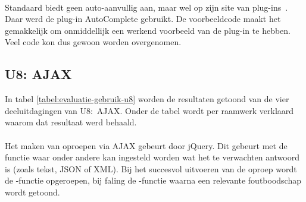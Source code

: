 \paragraph{\lungo}
Standaard biedt \lungo{} geen auto-aanvullig aan, maar wel op zijn site van plug-ins~\cite{TapQuo2013b}.
Daar werd de plug-in AutoComplete gebruikt.
De voorbeeldcode maakt het gemakkelijk om onmiddellijk een werkend voorbeeld van de plug-in te hebben.
Veel code kon dus gewoon worden overgenomen.

\subsection{U8: AJAX}
In tabel \ref{tabel:evaluatie-gebruik-u8} worden de resultaten getoond van de vier deeluitdagingen van U8:~AJAX.
Onder de tabel wordt per raamwerk verklaard waarom dat resultaat werd behaald.

\begin{table}[H]
\centering
{}
\caption{Gebruik voor U8: AJAX}
\label{tabel:evaluatie-gebruik-u8}
\end{table}


\paragraph{\jqm}
Het maken van oproepen via AJAX gebeurt door jQuery. 
Dit gebeurt met de functie  waar onder andere kan ingesteld worden wat het te verwachten antwoord is (zoals tekst, JSON of XML). 
Bij het succesvol uitvoeren van de oproep wordt de -functie opgeroepen, bij faling de -functie waarna een relevante foutboodschap wordt getoond.

